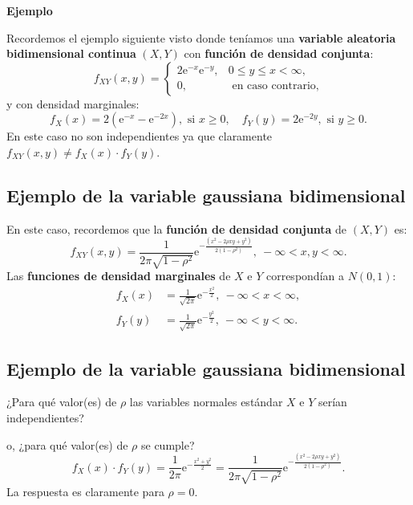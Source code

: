 \documentclass[]{book}
\begin{document}
\textbf{Ejemplo}

Recordemos el ejemplo siguiente visto donde teníamos una \textbf{variable aleatoria bidimensional continua} \((X,Y)\) con \textbf{función de densidad conjunta}:
\[
f_{XY}(x,y)=\begin{cases}
2 \mathrm{e}^{-x}\mathrm{e}^{-y}, & 0\leq y\leq x < \infty,\\
0, & \mbox{ en caso contrario,}
\end{cases}
\]
y con densidad marginales:
\[
f_X(x)  = 2\left(\mathrm{e}^{-x}-\mathrm{e}^{-2x}\right),\mbox{ si }x\geq 0, \quad
f_Y(y)  =  2\mathrm{e}^{-2y}, \mbox{ si }y\geq 0.
\]
En este caso no son independientes ya que claramente \(f_{XY}(x,y)\neq f_X(x)\cdot f_Y(y)\).

\hypertarget{ejemplo-de-la-variable-gaussiana-bidimensional}{%
\subsection{Ejemplo de la variable gaussiana bidimensional}\label{ejemplo-de-la-variable-gaussiana-bidimensional}}

En este caso, recordemos que la \textbf{función de densidad conjunta} de \((X,Y)\) es:
\[
f_{XY}(x,y)=\frac{1}{2\pi\sqrt{1-\rho^2}}\mathrm{e}^{-\frac{(x^2-2\rho xy+y^2)}{2(1-\rho^2)}},\ -\infty <x,y<\infty.
\]
Las \textbf{funciones de densidad marginales} de \(X\) e \(Y\) correspondían a \(N(0,1)\):
\[
\begin{array}{rl}
f_X(x) & =\frac{1}{\sqrt{2\pi}}\mathrm{e}^{-\frac{x^2}{2}},\ -\infty <x<\infty,\\ f_Y(y) & =\frac{1}{\sqrt{2\pi}}\mathrm{e}^{-\frac{y^2}{2}},\ -\infty <y<\infty.
\end{array}
\]

\hypertarget{ejemplo-de-la-variable-gaussiana-bidimensional-1}{%
\subsection{Ejemplo de la variable gaussiana bidimensional}\label{ejemplo-de-la-variable-gaussiana-bidimensional-1}}

¿Para qué valor(es) de \(\rho\) las variables normales estándar \(X\) e \(Y\) serían independientes?

o, ¿para qué valor(es) de \(\rho\) se cumple?
\[
f_X(x)\cdot f_Y(y)=\frac{1}{2\pi}\mathrm{e}^{-\frac{x^2+y^2}{2}} = \frac{1}{2\pi\sqrt{1-\rho^2}}\mathrm{e}^{-\frac{(x^2-2\rho xy+y^2)}{2(1-\rho^2)}}.
\]
La respuesta es claramente para \(\rho=0\).
\end{document}
